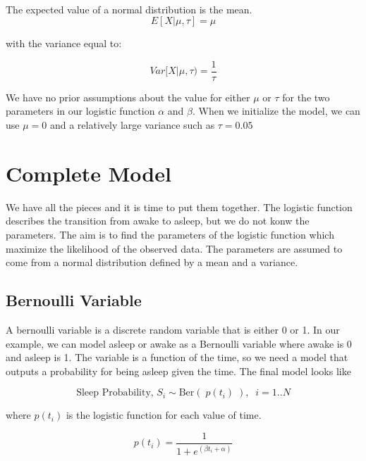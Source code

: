 \documentclass[12pt]{article}
\begin{document}
    \begin{center}
    \end{center}
    { \hspace*{\fill} \\}
    
    The expected value of a normal distribution is the mean.
\[ E[ X | \mu, \tau] = \mu\]

with the variance equal to:

\[ Var[ X | \mu, \tau) = \frac{1}{\tau}\]

We have no prior assumptions about the value for either \(\mu\) or
\(\tau\) for the two parameters in our logistic function \(\alpha\) and
\(\beta\). When we initialize the model, we can use \(\mu = 0\) and a
relatively large variance such as \(\tau = 0.05\)

    \hypertarget{complete-model}{%
\section{Complete Model}\label{complete-model}}

We have all the pieces and it is time to put them together. The logistic
function describes the transition from awake to asleep, but we do not
konw the parameters. The aim is to find the parameters of the logistic
function which maximize the likelihood of the observed data. The
parameters are assumed to come from a normal distribution defined by a
mean and a variance.

\hypertarget{bernoulli-variable}{%
\subsection{Bernoulli Variable}\label{bernoulli-variable}}

A bernoulli variable is a discrete random variable that is either 0 or
1. In our example, we can model asleep or awake as a Bernoulli variable
where awake is 0 and asleep is 1. The variable is a function of the
time, so we need a model that outputs a probability for being asleep
given the time. The final model looks like

\[ \text{Sleep Probability, $S_i$} \sim \text{Ber}( \;p(t_i)\; ), \;\; i=1..N\]

where \(p(t_i)\) is the logistic function for each value of time.

\[ p(t_i) = \frac{1}{1 + e^{(\beta t_i + \alpha)}}\]
\end{document}
